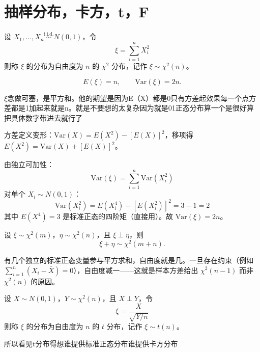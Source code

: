 \section{抽样分布，卡方，t，F}

\begin{definition}[$\chi^2$ 分布]
设 $X_1, \ldots, X_n \overset{\text{i.i.d.}}{\sim} N(0,1)$，令
$$\xi = \sum_{i=1}^n X_i^2$$
则称 $\xi$ 的分布为自由度为 $n$ 的 $\chi^2$ 分布，记作 $\xi \sim \chi^2(n)$。
\end{definition}

\begin{note}[要背的公式]
$$E(\xi) = n, \qquad \mathrm{Var}(\xi) = 2n.$$
\end{note}
\begin{dxtips}
    $\xi$念做可塞，是平方和。他的期望是因为E（X）都是0只有方差起效果每一个点方差都是1加起来就是n。就是不要想的太复杂因为就是01正态分布算一个是很好算把具体数字带进去就行了
\end{dxtips}
\begin{note}
方差定义变形：$\mathrm{Var}(X) = E(X^2) - [E(X)]^2$，移项得 $E(X^2) = \mathrm{Var}(X) + [E(X)]^2$。
\end{note}
\begin{note}[Var$(\xi)=2n$ 的推导]
由独立可加性：
$$\mathrm{Var}(\xi) = \sum_{i=1}^n \mathrm{Var}(X_i^2)$$
对单个 $X_i \sim N(0,1)$：
$$\mathrm{Var}(X_i^2) = E(X_i^4) - [E(X_i^2)]^2 = 3 - 1 = 2$$
其中 $E(X^4)=3$ 是标准正态的四阶矩（直接用）。故 $\mathrm{Var}(\xi) = 2n$。
\end{note}

\begin{theorem}[可加性]
设 $\xi \sim \chi^2(m)$，$\eta \sim \chi^2(n)$，且 $\xi \perp \eta$，则
$$\xi + \eta \sim \chi^2(m+n).$$
\end{theorem}

\begin{note}[自由度的直觉]
有几个独立的标准正态变量参与平方求和，自由度就是几。一旦存在约束（例如 $\sum_{i=1}^n(X_i - \bar{X}) = 0$），自由度减一——这就是样本方差给出 $\chi^2(n-1)$ 而非 $\chi^2(n)$ 的原因。
\end{note}
\begin{definition}
设 $X \sim N(0,1)$，$Y \sim \chi^2(n)$，且 $X \perp Y$，令
$$\xi = \frac{X}{\sqrt{Y/n}}$$
则称 $\xi$ 的分布为自由度为 $n$ 的 $t$ 分布，记作 $\xi \sim t(n)$。
\end{definition}
\begin{dxtips}
    所以看见t分布得想谁提供标准正态分布谁提供卡方分布
\end{dxtips}

